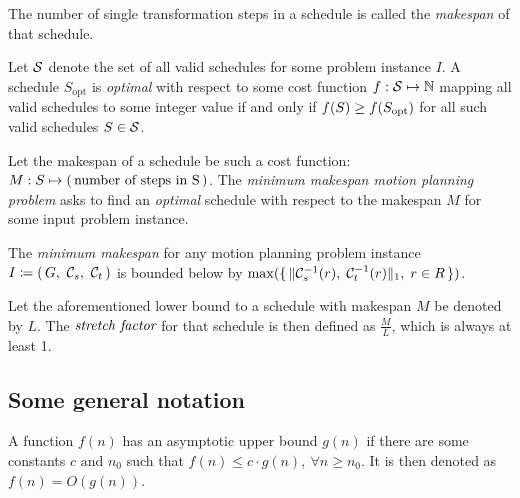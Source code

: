 \begin{definition}\label{def:makespan}
	The number of single transformation steps in a schedule is called the \emph{makespan} of that schedule.
\end{definition}

\begin{definition}\label{def:optimality}
	Let \(\mathcal{S}\) denote the set of all valid schedules for some problem instance \(I\). 
	A schedule \(S_\text{opt}\) is \emph{optimal} with respect to some cost function \(f : \mathcal{S} \mapsto \mathbb{N}\) mapping all valid schedules to some integer value if and only if \(f(S) \geq f(S_\text{opt})\) for all such valid schedules \(S \in \mathcal{S}\).
\end{definition}

\begin{definition}\label{def:m3pp}
	Let the makespan of a schedule be such a cost function: \(M : S \mapsto (\, \text{number of steps in S} \,)\). 
	The \emph{minimum makespan motion planning problem} asks to find an \emph{optimal} schedule with respect to the makespan \(M\) for some input problem instance.
\end{definition}

\begin{remark}
	The \emph{minimum makespan} for any motion planning problem instance \(I \coloneqq \parens{G,\ \conf{s},\ \conf{t}}\) is bounded below by \(\max(\set{\lVert\ensuremath{\mathcal{C}_{s}}^{-1}(r), \; \ensuremath{\mathcal{C}_{t}}^{-1}(r)\rVert_1, \; r \in R})\).
\end{remark}

\begin{definition}
	Let the aforementioned lower bound to a schedule with makespan \(M\) be denoted by \(L\). 
	The \(\emph{stretch factor}\) for that schedule is then defined as \(\frac{M}{L}\), which is always at least 1. 
\end{definition}

\subsection{Some general notation}

\begin{definition}
	A function \(f(n)\) has an asymptotic upper bound \(g(n)\) if there are some constants \(c \text{ and } n_0\) such that \(f(n) \leq c\cdot g(n),\ \forall n \geq n_0\). 
	It is then denoted as \(f(n) = O(g(n))\). 
\end{definition}

